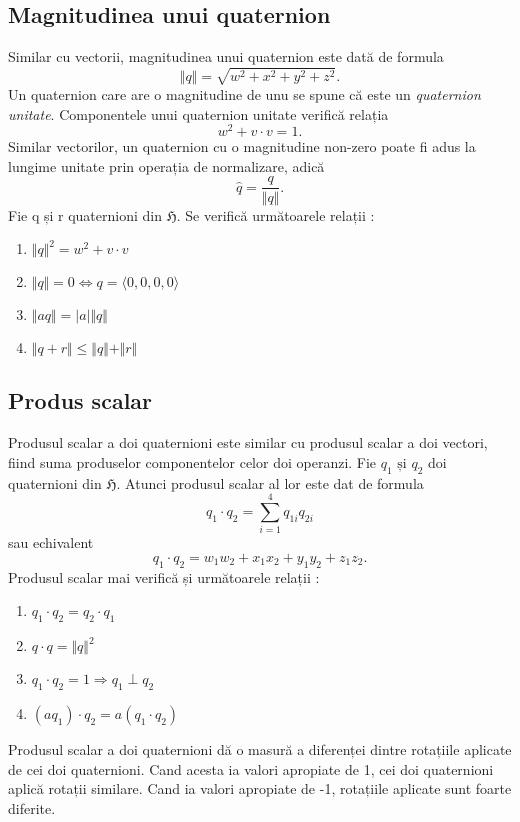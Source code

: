 \subsection{Magnitudinea unui quaternion}
\label{ch1:sec_quaternions:sub_magnitude}
Similar cu vectorii, magnitudinea unui quaternion este dată de formula
\begin{equation}
\Vert q \Vert = \sqrt{w^2 + x^2 + y^2 + z^2}.
\end{equation}
Un quaternion care are o magnitudine de unu se spune că este un
\textit{quaternion unitate}. Componentele unui quaternion unitate verifică
relația
\begin{equation}
w^2 + v \cdot v = 1.
\end{equation}
Similar vectorilor, un quaternion cu o magnitudine
non-zero poate fi adus la lungime unitate prin operația de normalizare, adică
\begin{equation}
\hat{q} = \frac{q}{\Vert q \Vert}.
\end{equation}
Fie q și r quaternioni din $\mathfrak{H}$. Se verifică următoarele relații :
\begin{enumerate}
    \item $\Vert q \Vert ^ 2 = w^2 + v \cdot v$
    \item $\Vert q \Vert = 0 \iff q = \langle 0, 0, 0, 0 \rangle$
    \item $\Vert \mathit{a}q \Vert = \vert \mathit{a} \vert \Vert q \Vert$
    \item $\Vert q + r \Vert \leq \Vert q \Vert + \Vert r \Vert$
\end{enumerate}

\subsection{Produs scalar}
\label{ch1:sec_quaternions:sub_scalar_product}
Produsul scalar a doi quaternioni este similar cu produsul scalar a doi vectori,
fiind suma produselor componentelor celor doi operanzi. Fie $q_{1} \text{ și }
q_{2}$ doi quaternioni din $\mathfrak{H}$. Atunci produsul scalar al lor este dat de
formula
\begin{equation}
q_{1} \cdot q_{2} = \sum_{i = 1}^{4} q_{1i}q_{2i} 
\end{equation} sau echivalent
\begin{equation}
q_{1} \cdot q_{2} = w_{1}w_{2} + x_{1}x_{2} + y_{1}y_{2} + z_{1}z_{2}.
\end{equation}
Produsul scalar mai verifică și următoarele relații :
\begin{enumerate}
\item $q_1 \cdot q_2 = q_2 \cdot q_1$
\item $q \cdot q = \Vert q \Vert ^ 2$
\item $q_1 \cdot q_2 = 1 \Rightarrow q_1 \perp q_2$
\item $(\mathit{a}q_1) \cdot q_2 = \mathit{a}(q_1 \cdot q_2)$
\end{enumerate}
Produsul scalar a doi quaternioni dă o masură a diferenței dintre rotațiile
aplicate de cei doi quaternioni. Cand acesta ia valori apropiate de 1, cei doi
quaternioni aplică rotații similare. Cand ia valori apropiate de -1, rotațiile
aplicate sunt foarte diferite.

